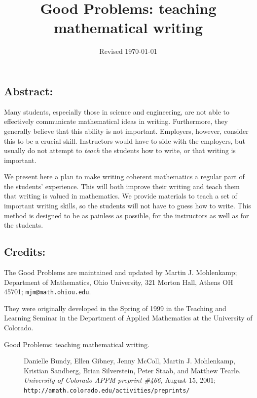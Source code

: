 \documentclass{article}
\title{Good Problems:
teaching mathematical writing}
\date{Revised \today}
\newlength{\originalbase}
\newcommand{\spacing}[1]{\setlength{\baselineskip}{#1\originalbase}}
\begin{document}
\spacing{1.67}

\maketitle

\vfill
\subsection*{Abstract:}

Many students, especially those in science and engineering, are not
able to effectively communicate mathematical ideas in
writing. Furthermore, they generally believe that this ability is not
important. Employers, however, consider this to be a crucial
skill. Instructors would have to side with the employers, but usually
do not attempt to {\em teach} the students how to write, or that
writing is important.

We present here a plan to make writing coherent mathematics a regular
part of the students' experience.  This will both improve their
writing and teach them that writing is valued in mathematics.  We
provide materials to teach a set of important writing skills, so the
students will not have to guess how to write. This method is designed
to be as painless as possible, for the instructors as well as for the
students.

\vfill
\spacing{1.0}
\subsection*{Credits:}

The Good Problems are maintained and updated by Martin J. Mohlenkamp;
Department of Mathematics, 
	Ohio University, 321 Morton Hall, Athens OH 45701; 
	\texttt{mjm@math.ohiou.edu}.

They were originally developed in the Spring of 1999 in the Teaching
and Learning Seminar in the Department of Applied Mathematics at the
University of Colorado.%
\begin{description}
\item[Good Problems: teaching mathematical writing.]
Danielle Bundy, Ellen Gibney, Jenny McColl, Martin J. Mohlenkamp,
Kristian Sandberg, Brian Silverstein, Peter Staab, and
Matthew Tearle.
{\em University of Colorado APPM preprint \#466,} August 15, 2001;\\
\texttt{http://amath.colorado.edu/activities/preprints/}
\end{description}
\end{document}
